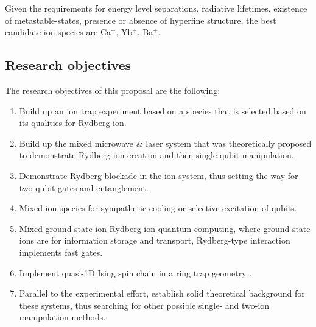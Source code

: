 Given the requirements for energy level separations, radiative lifetimes, existence of metastable-states, presence or absence of hyperfine structure, the best candidate ion species are Ca$^+$, Yb$^+$, Ba$^+$.

\subsection{Research objectives}
The research objectives of this proposal are the following:
\begin{enumerate}
 \item Build up an ion trap experiment based on a species that is selected based on its qualities for Rydberg ion.
 \item Build up the mixed microwave \& laser system that was theoretically proposed \cite{Mueller2008} to demonstrate Rydberg ion creation and then single-qubit manipulation.
 \item Demonstrate Rydberg blockade in the ion system, thus setting the way for two-qubit gates and entanglement.
 \item Mixed ion species for sympathetic cooling \cite{Home2009} or selective excitation of qubits.
 \item Mixed ground state ion Rydberg ion quantum computing, where ground state ions are for information storage and transport, Rydberg-type interaction implements fast gates.
 \item Implement quasi-1D Ising spin chain \cite{Olmos2009} in a ring trap geometry \cite{Champenois2010}.
 \item Parallel to the experimental effort, establish solid theoretical background for these systems, thus searching for other possible single- and two-ion manipulation methods.
\end{enumerate}
